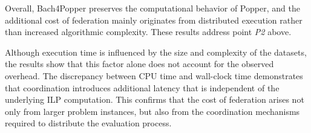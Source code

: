 Overall, Bach4Popper preserves the computational behavior of Popper, and the additional cost of federation mainly originates from distributed execution rather than increased algorithmic complexity.
These results address point \textit{P2} above.

Although execution time is influenced by the size and complexity of the datasets, the results show that this factor alone does not account for the observed overhead. The discrepancy between CPU time and wall-clock time demonstrates that coordination introduces additional latency that is independent of the underlying ILP computation. This confirms that the cost of federation arises not only from larger problem instances, but also from the coordination mechanisms required to distribute the evaluation process.






